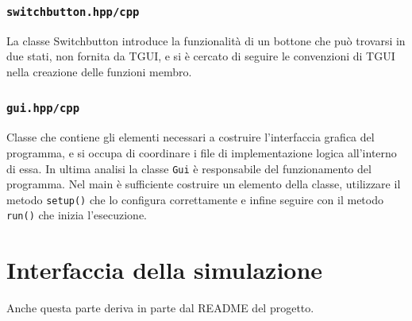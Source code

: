 \documentclass[10pt,a4paper]{article}
\begin{document}
\subsubsection{\texttt{switchbutton.hpp/cpp}}

La classe Switchbutton introduce la funzionalità di un bottone che può trovarsi in due stati, non fornita da TGUI, e si è cercato di seguire le convenzioni di TGUI nella creazione delle funzioni membro. 

\subsubsection{\texttt{gui.hpp/cpp}}

Classe che contiene gli elementi necessari a costruire l'interfaccia grafica del programma, e si occupa di coordinare i file di implementazione logica all'interno di essa. In ultima analisi la classe \texttt{Gui} è responsabile del funzionamento del programma. Nel main è sufficiente costruire un elemento della classe, utilizzare il metodo \texttt{setup()} che lo configura correttamente e infine seguire con il metodo \texttt{run()} che inizia l'esecuzione.

\newpage

\section{Interfaccia della simulazione}

Anche questa parte deriva in parte dal README del progetto.




\end{document}
